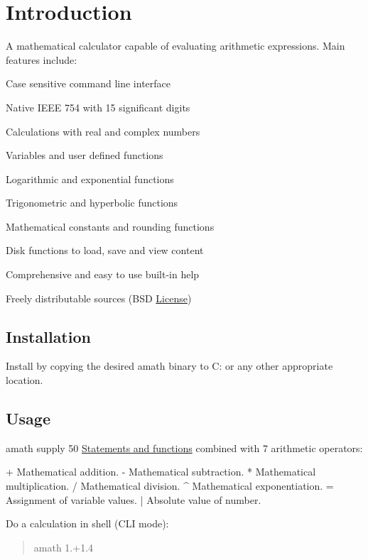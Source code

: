\hypertarget{index_intro_sec}{}\section{Introduction}\label{index_intro_sec}
A mathematical calculator capable of evaluating arithmetic expressions. Main features include\+:
\begin{DoxyItemize}
\item Case sensitive command line interface
\item Native I\+E\+EE 754 with 15 significant digits
\item Calculations with real and complex numbers
\item Variables and user defined functions
\item Logarithmic and exponential functions
\item Trigonometric and hyperbolic functions
\item Mathematical constants and rounding functions
\item Disk functions to load, save and view content
\item Comprehensive and easy to use built-\/in help
\item Freely distributable sources (B\+SD \hyperlink{license_page}{License})
\end{DoxyItemize}\hypertarget{index_install}{}\subsection{Installation}\label{index_install}
Install by copying the desired amath binary to C\+: or any other appropriate location.\hypertarget{index_usage}{}\subsection{Usage}\label{index_usage}
amath supply 50 \hyperlink{command_page}{Statements and functions} combined with 7 arithmetic operators\+: \begin{DoxyVerb}    +     Mathematical addition.
    -     Mathematical subtraction.
    *     Mathematical multiplication.
    /     Mathematical division.
    ^     Mathematical exponentiation.
    =     Assignment of variable values.
    |     Absolute value of number.
\end{DoxyVerb}


Do a calculation in shell (C\+LI mode)\+: \begin{quote}
amath 1.+1.4 \end{quote}


